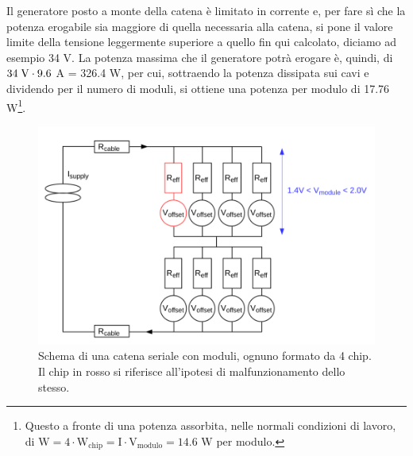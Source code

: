 Il generatore posto a monte della catena è limitato in corrente e, per fare sì che la potenza erogabile sia maggiore di quella necessaria alla catena, si pone il valore limite della tensione leggermente superiore a quello fin qui calcolato, diciamo ad esempio 34 V.
La potenza massima che il generatore potrà erogare è, quindi, di $34 \rm \; V \cdot 9.6$ A = 326.4 W, per cui, sottraendo la potenza dissipata sui cavi e dividendo per il numero di moduli, si ottiene una potenza per modulo di 17.76 W\footnote{Questo a fronte di una potenza assorbita, nelle normali condizioni di lavoro, di $\mathrm{W = 4 \cdot W_{chip} = I \cdot V_{modulo} = 14.6}$ W per modulo.}.

\begin{figure}
\centering
\includegraphics[scale=.3]{Immagini/MultiChipModules}
\caption{Schema di una catena seriale con moduli, ognuno formato da 4 chip. Il chip in rosso si riferisce all'ipotesi di malfunzionamento dello stesso.}
\label{MCM}
\end{figure}

